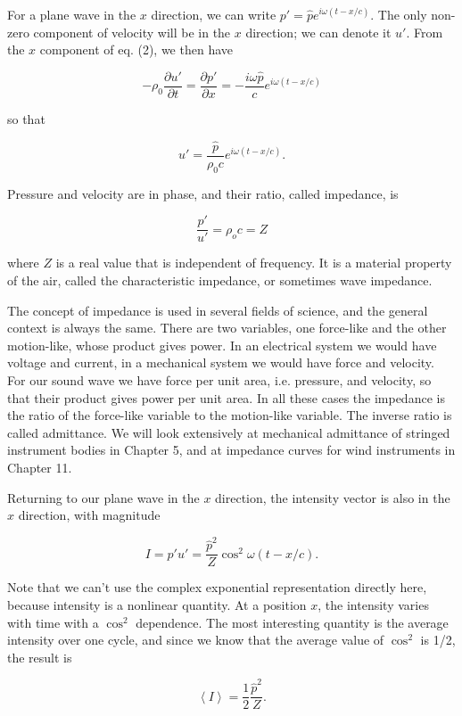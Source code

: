   For a plane wave in the $x$ direction, we can write $p'=\hat{p} e^{i \omega 
  (t-x/c)}$. The only non-zero component of velocity will be in the $x$ 
  direction; we can denote it $u'$. From the $x$ component of eq. (2), we then 
  have 

  $$-\rho_0 \dfrac{\partial u'}{\partial t} = \dfrac{\partial p'}{\partial x} = 
  -\dfrac{i \omega \hat{p}}{c} e^{i \omega (t-x/c)} \tag{7}$$ 

  so that 

  $$u' = \dfrac{\hat{p}}{\rho_0 c} e^{i \omega (t-x/c)} . \tag{8}$$ 

  Pressure and velocity are in phase, and their ratio, called impedance, is 

  $$\frac{p'}{u'} = \rho_o c =Z \tag{9}$$ 

  where $Z$ is a real value that is independent of frequency. It is a material 
  property of the air, called the characteristic impedance, or sometimes wave 
  impedance. 

  The concept of impedance is used in several fields of science, and the 
  general context is always the same. There are two variables, one force-like 
  and the other motion-like, whose product gives power. In an electrical system 
  we would have voltage and current, in a mechanical system we would have force 
  and velocity. For our sound wave we have force per unit area, i.e. pressure, 
  and velocity, so that their product gives power per unit area. In all these 
  cases the impedance is the ratio of the force-like variable to the 
  motion-like variable. The inverse ratio is called admittance. We will look 
  extensively at mechanical admittance of stringed instrument bodies in Chapter 
  5, and at impedance curves for wind instruments in Chapter 11. 

  Returning to our plane wave in the $x$ direction, the intensity vector is 
  also in the $x$ direction, with magnitude 

  $$I=p' u' = \dfrac{\hat{p}^2}{Z} \cos^2{\omega (t-x/c)} . \tag{10}$$ 

  Note that we can't use the complex exponential representation directly here, 
  because intensity is a nonlinear quantity. At a position $x$, the intensity 
  varies with time with a $\cos^2$ dependence. The most interesting quantity is 
  the average intensity over one cycle, and since we know that the average 
  value of $\cos^2$ is 1/2, the result is 

  $$\left< I \right> =\frac{1}{2} \frac{\hat{p}^2}{Z} . \tag{11}$$ 

